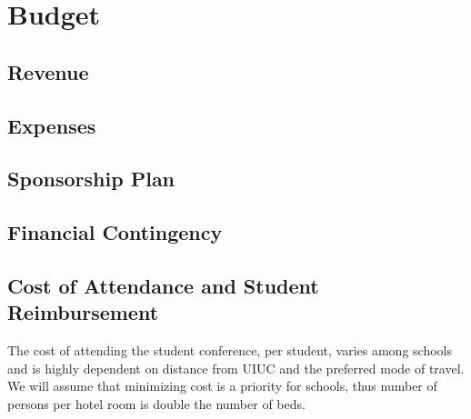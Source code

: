 \section{Budget}


\subsection{Revenue}

\subsection{Expenses}

\subsection{Sponsorship Plan}



\subsection{Financial Contingency}

\subsection{Cost of Attendance and Student Reimbursement}
The cost of attending the student conference, per student, varies among schools and is highly dependent on distance from UIUC and the preferred mode of travel. We will assume that minimizing cost is a priority for schools, thus number of persons per hotel room is double the number of beds. 